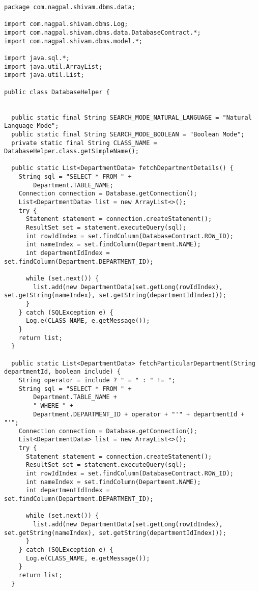 \begin{lstlisting}[caption=DatabaseHelper.java]
package com.nagpal.shivam.dbms.data;

import com.nagpal.shivam.dbms.Log;
import com.nagpal.shivam.dbms.data.DatabaseContract.*;
import com.nagpal.shivam.dbms.model.*;

import java.sql.*;
import java.util.ArrayList;
import java.util.List;

public class DatabaseHelper {


  public static final String SEARCH_MODE_NATURAL_LANGUAGE = "Natural Language Mode";
  public static final String SEARCH_MODE_BOOLEAN = "Boolean Mode";
  private static final String CLASS_NAME = DatabaseHelper.class.getSimpleName();

  public static List<DepartmentData> fetchDepartmentDetails() {
    String sql = "SELECT * FROM " +
        Department.TABLE_NAME;
    Connection connection = Database.getConnection();
    List<DepartmentData> list = new ArrayList<>();
    try {
      Statement statement = connection.createStatement();
      ResultSet set = statement.executeQuery(sql);
      int rowIdIndex = set.findColumn(DatabaseContract.ROW_ID);
      int nameIndex = set.findColumn(Department.NAME);
      int departmentIdIndex = set.findColumn(Department.DEPARTMENT_ID);

      while (set.next()) {
        list.add(new DepartmentData(set.getLong(rowIdIndex), set.getString(nameIndex), set.getString(departmentIdIndex)));
      }
    } catch (SQLException e) {
      Log.e(CLASS_NAME, e.getMessage());
    }
    return list;
  }

  public static List<DepartmentData> fetchParticularDepartment(String departmentId, boolean include) {
    String operator = include ? " = " : " != ";
    String sql = "SELECT * FROM " +
        Department.TABLE_NAME +
        " WHERE " +
        Department.DEPARTMENT_ID + operator + "'" + departmentId + "'";
    Connection connection = Database.getConnection();
    List<DepartmentData> list = new ArrayList<>();
    try {
      Statement statement = connection.createStatement();
      ResultSet set = statement.executeQuery(sql);
      int rowIdIndex = set.findColumn(DatabaseContract.ROW_ID);
      int nameIndex = set.findColumn(Department.NAME);
      int departmentIdIndex = set.findColumn(Department.DEPARTMENT_ID);

      while (set.next()) {
        list.add(new DepartmentData(set.getLong(rowIdIndex), set.getString(nameIndex), set.getString(departmentIdIndex)));
      }
    } catch (SQLException e) {
      Log.e(CLASS_NAME, e.getMessage());
    }
    return list;
  }


\end{lstlisting}
